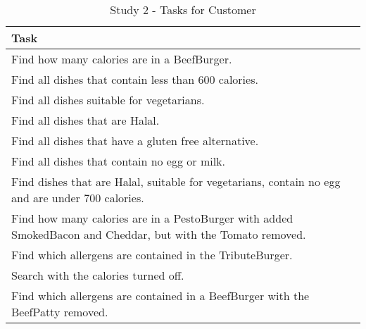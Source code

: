 \begin{table}[h]
    \centering
    \begin{tabular}{ |p{\textwidth}| }
    \hline
    \textbf{Task}\\
    \hline
    Find how many calories are in a BeefBurger. \\
    \hline
    Find all dishes that contain less than 600 calories. \\
    \hline
    Find all dishes suitable for vegetarians. \\
    \hline
    Find all dishes that are Halal. \\
    \hline
    Find all dishes that have a gluten free alternative. \\
    \hline
    Find all dishes that contain no egg or milk. \\
    \hline
    Find dishes that are Halal, suitable for vegetarians, contain no egg and are under 700 calories. \\
    \hline
    Find how many calories are in a PestoBurger with added SmokedBacon and Cheddar, but with the Tomato removed. \\
    \hline
    Find which allergens are contained in the TributeBurger. \\
    \hline
    Search with the calories turned off. \\
    \hline
    Find which allergens are contained in a BeefBurger with the BeefPatty removed. \\
    \hline
    \end{tabular}
    \caption{Study 2 - Tasks for Customer}
    \label{tab:Study2TasksC}
\end{table}


